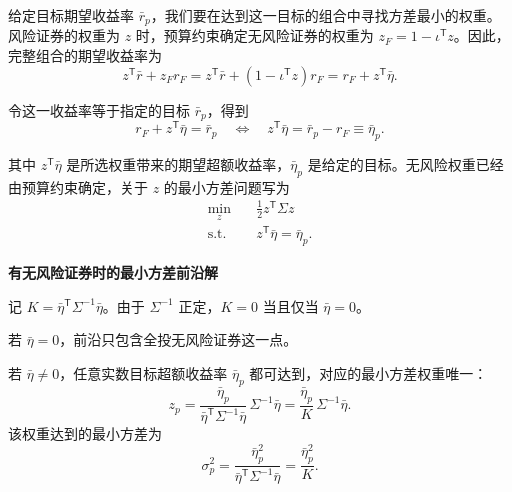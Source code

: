 给定目标期望收益率 $\bar r_p$，我们要在达到这一目标的组合中寻找方差最小的权重。风险证券的权重为 $z$ 时，预算约束确定无风险证券的权重为 $z_F=1-\iota^{\mathsf T}z$。因此，完整组合的期望收益率为
\[
 z^{\mathsf T}\bar r+z_Fr_F
 =z^{\mathsf T}\bar r+(1-\iota^{\mathsf T}z)r_F
 =r_F+z^{\mathsf T}\bar\eta.
\]

令这一收益率等于指定的目标 $\bar r_p$，得到
\[
 r_F+z^{\mathsf T}\bar\eta=\bar r_p
 \quad\Longleftrightarrow\quad
 z^{\mathsf T}\bar\eta=\bar r_p-r_F\equiv\bar\eta_p.
\]

其中 $z^{\mathsf T}\bar\eta$ 是所选权重带来的期望超额收益率，$\bar\eta_p$ 是给定的目标。无风险权重已经由预算约束确定，关于 $z$ 的最小方差问题写为
\[
 \begin{aligned}
 \min_z\quad &\tfrac12 z^{\mathsf T}\Sigma z\\
 \text{s.t.}\quad &z^{\mathsf T}\bar\eta=\bar\eta_p.
 \end{aligned}
\]

\begin{tcolorbox}[knowledge]
\textbf{有无风险证券时的最小方差前沿解}

记 $K=\bar\eta^{\mathsf T}\Sigma^{-1}\bar\eta$。由于 $\Sigma^{-1}$ 正定，$K=0$ 当且仅当 $\bar\eta=0$。

若 $\bar\eta=0$，前沿只包含全投无风险证券这一点。

若 $\bar\eta\ne0$，任意实数目标超额收益率 $\bar\eta_p$ 都可达到，对应的最小方差权重唯一：
\begin{equation}
 z_p=\frac{\bar\eta_p}{\bar\eta^{\mathsf T}\Sigma^{-1}\bar\eta}\,\Sigma^{-1}\bar\eta
     =\frac{\bar\eta_p}{K}\,\Sigma^{-1}\bar\eta.
 \label{eq:wj-12-7}
\end{equation}
该权重达到的最小方差为
\begin{equation*}
 \sigma_p^2=\frac{\bar\eta_p^2}{\bar\eta^{\mathsf T}\Sigma^{-1}\bar\eta}
            =\frac{\bar\eta_p^2}{K}.
 \tag{12.XI}\label{eq:wj-12-risk-free-frontier-variance}
\end{equation*}
\end{tcolorbox}

